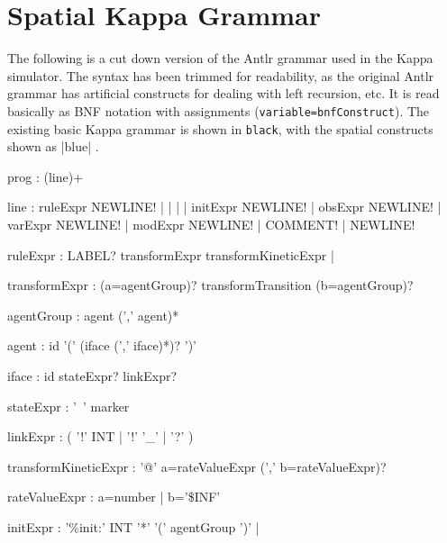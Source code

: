 \chapter{Spatial Kappa Grammar}
\label{chap:spatialGrammar}



The following is a cut down version of the Antlr grammar used in the Kappa simulator. The syntax has been trimmed for readability, as the original Antlr grammar has artificial constructs for dealing with left recursion, etc. It is read basically as BNF notation with assignments (\verb|variable=bnfConstruct|). The existing basic Kappa grammar is shown in \verb|black|, with the spatial constructs shown as |blue| . 


\begin{bnfsource}
prog :
  (line)+

line :
  ruleExpr NEWLINE!
  | 
  | 
  | 
  | initExpr NEWLINE!
  | obsExpr NEWLINE!
  | varExpr NEWLINE!
  | modExpr NEWLINE!
  | COMMENT!
  | NEWLINE!

ruleExpr :
  LABEL? transformExpr transformKineticExpr 
  |  

transformExpr :
  (a=agentGroup)? transformTransition (b=agentGroup)?


agentGroup :
  agent (',' agent)*

agent :
  id '(' (iface (',' iface)*)? ')'

iface :
  id stateExpr? linkExpr?

stateExpr :
  '~' marker

linkExpr :
  ( '!' INT | '!' '_'  | '?' )

transformKineticExpr :
  '@' a=rateValueExpr (',' b=rateValueExpr)?


rateValueExpr :
  a=number
  | b='\$INF'

initExpr :
  '\%init:' INT '*' '(' agentGroup ')'
  | 



\end{bnfsource}
